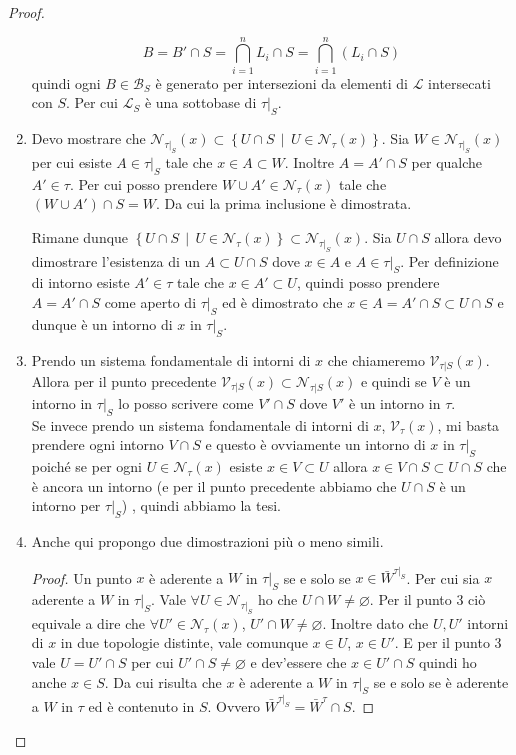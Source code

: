 \begin{proof}
\begin{enumerate}
		\begin{equation*}
			B = B' \cap S = \bigcap^n_{i=1} L_i \cap S = \bigcap^n_{i=1} (L_i \cap S)
		\end{equation*} 
		quindi ogni $B \in \mathcal{B}_S$ è generato per intersezioni da elementi di $\mathcal{L}$ intersecati con $S$. Per cui $\mathcal{L}_S$ è una sottobase di $\tau|_S$. 
	\item 
		Devo mostrare che $\mathcal{N}_{\tau|_S}(x) \subset \left\{ U \cap S \,\middle|\, U \in \mathcal{N}_\tau(x) \right\}$. Sia $W \in \mathcal{N}_{\tau|_S}(x)$ per cui esiste $A \in \tau|_S$ tale che $x \in A \subset W$. Inoltre $A = A' \cap S$ per qualche $A' \in \tau$. Per cui posso prendere $W \cup A' \in \mathcal{N}_\tau(x)$ tale che $(W \cup A') \cap S = W$. Da cui la prima inclusione è dimostrata.
		
		Rimane dunque $\left\{ U \cap S \,\middle|\, U \in \mathcal{N}_\tau(x) \right\} \subset \mathcal{N}_{\tau|_S}(x)$. Sia $U \cap S$ allora devo dimostrare l'esistenza di un $A \subset U \cap S$ dove $x \in A$ e $A \in \tau|_S$. Per definizione di intorno esiste $A' \in \tau$ tale che $x \in A' \subset U$, quindi posso prendere $A = A' \cap S$ come aperto di $\tau|_S$ ed è dimostrato che $x \in A = A' \cap S \subset U \cap S$ e dunque è un intorno di $x$ in $\tau|_S$.
	\item 
		Prendo un sistema fondamentale di intorni di $x$ che chiameremo $\mathcal{V}_{\tau|S}(x)$. Allora per il punto precedente $\mathcal{V}_{\tau|S}(x) \subset \mathcal{N}_{\tau|S}(x)$ e quindi se $V$ è un intorno in $\tau|_S$ lo posso scrivere come $V' \cap S$ dove $V'$ è un intorno in $\tau$.\\
		Se invece prendo un sistema fondamentale di intorni di $x$, $\mathcal{V}_{\tau}(x)$, mi basta prendere ogni intorno $V \cap S$ e questo è ovviamente un intorno di $x$ in $\tau|_S$ poiché se per ogni $U \in \mathcal{N}_\tau(x)$ esiste $x \in V \subset U$ allora $x \in V\cap S \subset U \cap S$ che è ancora un intorno (e per il punto precedente abbiamo che $U \cap S$ è un intorno per $\tau|_S$) , quindi abbiamo la tesi. 
	\item Anche qui propongo due dimostrazioni più o meno simili.
	\begin{proof}
		Un punto $x$ è aderente a $W$ in $\tau|_S$ se e solo se $x \in \bar{W}^{\tau|_S}$. Per cui sia $x$ aderente a $W$ in $\tau|_S$. Vale $\forall U \in \mathcal{N}_{\tau|_S}$ ho che $U \cap W \neq \varnothing$. Per il punto 3 ciò equivale a dire che $\forall U' \in \mathcal{N}_\tau(x)$, $U' \cap W \neq \varnothing$. Inoltre dato che $U, U'$ intorni di $x$ in due topologie distinte, vale comunque $x \in U$, $x \in U'$. E per il punto 3 vale $U = U' \cap S$ per cui $U' \cap S \neq \varnothing$ e dev'essere che $x \in U' \cap S$ quindi ho anche $x \in S$. Da cui risulta che $x$ è aderente a $W$ in $\tau|_S$  se e solo se è aderente a $W$ in $\tau$ ed è contenuto in $S$. Ovvero $\bar{W}^{\tau|_S} = \bar{W}^{\tau} \cap S$. 

\end{proof}
\end{enumerate}
\end{proof}
